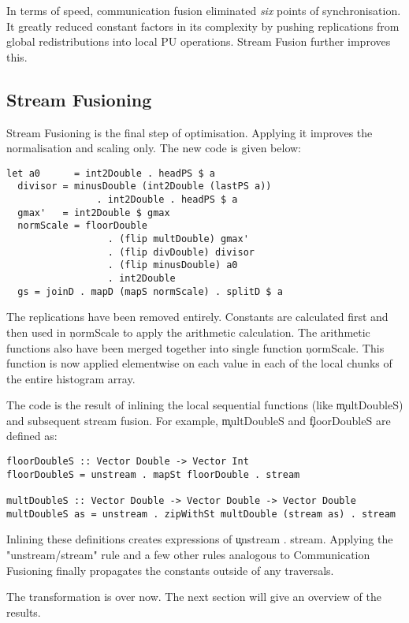     In terms of speed, communication fusion eliminated \emph{six} points of synchronisation.
    It greatly reduced constant factors in its complexity by pushing
    replications from global redistributions into local PU operations.
    Stream Fusion further improves this.
    
  \subsection{Stream Fusioning}
    Stream Fusioning is the final step of optimisation. Applying it improves
    the normalisation and scaling only. The new code is given below:
    \begin{lstlisting}
let a0      = int2Double . headPS $ a 
  divisor = minusDouble (int2Double (lastPS a))
                . int2Double . headPS $ a
  gmax'   = int2Double $ gmax
  normScale = floorDouble
                  . (flip multDouble) gmax'
                  . (flip divDouble) divisor
                  . (flip minusDouble) a0
                  . int2Double
  gs = joinD . mapD (mapS normScale) . splitD $ a
     \end{lstlisting}
     The replications have been removed entirely.
     Constants are calculated first and then used in \c{normScale}
     to apply the arithmetic calculation.
     The arithmetic functions also have been merged together into
     single function \c{normScale}. This function is now applied elementwise
     on each value in each of the local chunks of the entire histogram array.
     
     The code is the result of inlining the local sequential functions (like \c{multDoubleS})
     and subsequent stream fusion.
     For example, \c{multDoubleS} and \c{floorDoubleS} are defined as:
     \begin{lstlisting}
floorDoubleS :: Vector Double -> Vector Int
floorDoubleS = unstream . mapSt floorDouble . stream

multDoubleS :: Vector Double -> Vector Double -> Vector Double
multDoubleS as = unstream . zipWithSt multDouble (stream as) . stream
     \end{lstlisting}
     Inlining these definitions creates expressions of \c{unstream . stream}. Applying
     the "unstream/stream" rule and a few other rules analogous to
     Communication Fusioning finally propagates the constants outside
     of any traversals.
     
     The transformation is over now. The next section will give an overview of the results.
         
